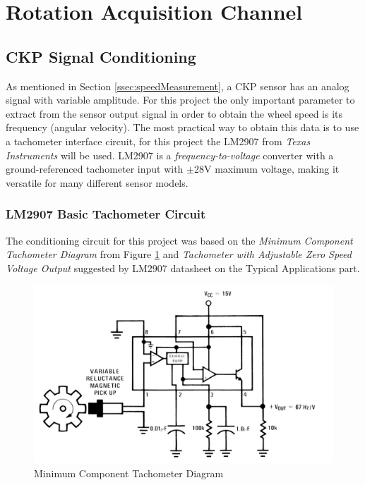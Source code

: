\section{Rotation Acquisition Channel}\label{sec:speed-acquisition-channel}

	\subsection{CKP Signal Conditioning}\label{ssec:ckp-signal-conditioning-circuit}

		As mentioned in Section \ref{ssec:speedMeasurement}, a CKP sensor has an analog signal with variable amplitude. For this project the only important parameter to extract from the sensor output signal in order to obtain the wheel speed is its frequency (angular velocity). The most practical way to obtain this data is to use a tachometer interface circuit, for this project the LM2907 from \textit{Texas Instruments} \cite{lm2907-datasheet} will be used. LM2907 is a \textit{frequency-to-voltage} converter with a ground-referenced tachometer input with $\pm$28V maximum voltage, making it versatile for many different sensor models.
		
		\subsubsection{LM2907 Basic Tachometer Circuit}\label{sssec:lm2907-basic-tachometer-circuit}
			The conditioning circuit for this project was based on the \textit{Minimum Component Tachometer Diagram } from Figure \ref{fig:lm2907-minimum-component-tachometer-diagram} and \textit{Tachometer with Adjustable Zero Speed Voltage Output} suggested by LM2907 datasheet  \cite{lm2907-datasheet} on the Typical Applications part.

			\begin{figure}[htbp]
				\centering
				\includegraphics[width=.8\textwidth]{figuras/fig-lm2907-minimum-component-tachometer-diagram}
				\caption{Minimum Component Tachometer Diagram \cite{lm2907-datasheet}}
				\label{fig:lm2907-minimum-component-tachometer-diagram}
			\end{figure}

